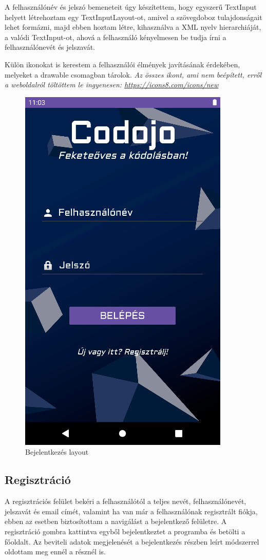 \documentclass{thesis-ekf}
\begin{document}
A felhasználónév és jelszó bemeneteit úgy készítettem, hogy egyszerű TextInput helyett létrehoztam egy TextInputLayout-ot, amivel a szövegdoboz tulajdonságait lehet formázni, majd ebben hoztam létre, kihasználva a XML nyelv hierarchiáját, a valódi TextInput-ot, ahová a felhasználó kényelmesen be tudja írni a felhasználónevét és jelszavát.

Külön ikonokat is kerestem a felhasználói élmények javításának érdekében, melyeket a drawable csomagban tárolok. \textit{Az összes ikont, ami nem beépített, erről a weboldalról töltöttem le ingyenesen: \url{https://icons8.com/icons/new}}
\begin{figure}[tbh]
	\centering
	\includegraphics[width=0.55\linewidth]{bejelentkezes}
	\caption{Bejelentkezés layout}
	\label{bejelentkezes}
\end{figure}

\subsection{Regisztráció}
A regisztrációs felület bekéri a felhasználótól a teljes nevét, felhasználónevét, jelszavát és email címét, valamint ha van már a felhasználónak regisztrált fiókja, ebben az esetben biztosítottam a navigálást a bejelentkező felületre. A regisztráció gombra kattintva egyből bejelentkeztet a programba és betölti a főoldalt. Az beviteli adatok megjelenését a bejelentkezés részben leírt módszerrel oldottam meg ennél a résznél is.
\end{document}
